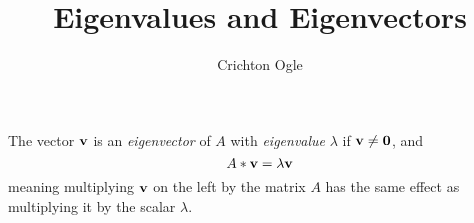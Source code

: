 \documentclass{ximera}
\title{Eigenvalues and Eigenvectors}
\author{Crichton Ogle}
\begin{document}
\begin{abstract}
\end{abstract}
\maketitle

The vector $\bf v$ is an {\it eigenvector} of $A$ with {\it eigenvalue} $\lambda$ if ${\bf v} \ne {\bf 0}$, and
\[
A*{\bf v} = \lambda{\bf v}
\]
meaning multiplying $\bf v$ on the left by the matrix $A$ has the same effect as multiplying it by the scalar $\lambda$.
\end{document}

